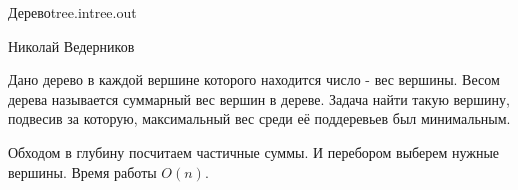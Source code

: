 \begin{proposal}{Дерево}{tree.in}{tree.out}{}

\Author                  
Николай Ведерников

\ProblemIdea
Дано дерево в каждой вершине которого находится число - вес вершины. Весом дерева называется суммарный вес вершин в дереве.
Задача найти такую вершину, подвесив за которую, максимальный вес среди её поддеревьев был минимальным.

\ProblemVariations

\SolutionIdea
Обходом в глубину посчитаем частичные суммы. И перебором выберем нужные вершины. Время работы $O(n)$.

\end{proposal}
